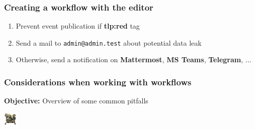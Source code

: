 \begin{frame}
    \frametitle{Creating a workflow with the editor}
    \begin{enumerate}
        \item Prevent event publication if \textbf{tlp:red} tag
        \item Send a mail to \texttt{admin@admin.test} about potential data leak
        \item Otherwise, send a notification on \textbf{Mattermost}, \textbf{MS Teams}, \textbf{Telegram}, ...
    \end{enumerate}
\end{frame}

\begin{frame}
    \frametitle{
        \huge
        Considerations when working with workflows
        \vspace{1em}
    }
    \textbf{Objective:} Overview of some common pitfalls
    \begin{center}
        \includegraphics[width=24px]{pictures/radar.png}
    \end{center}
\end{frame}

